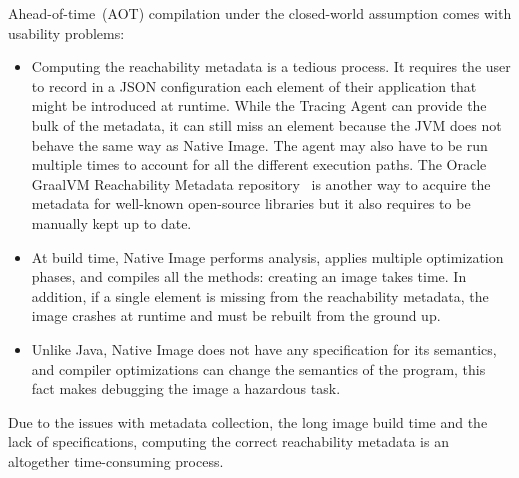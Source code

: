 Ahead-of-time~(AOT) compilation under the closed-world assumption comes with usability problems:
\begin{itemize}
    \item Computing the reachability metadata is a tedious process. It requires the user to record in a JSON configuration each element of their application that might be introduced at runtime. While the Tracing Agent can provide the bulk of the metadata, it can still miss an element because the JVM does not behave the same way as Native Image. The agent may also have to be run multiple times to account for all the different execution paths. The Oracle GraalVM Reachability Metadata repository~\cite{noauthor_oraclegraalvm-reachability-metadata_2024} is another way to acquire the metadata for well-known open-source libraries but it also requires to be manually kept up to date.
    \item At build time, Native Image performs analysis, applies multiple optimization phases, and compiles all the methods: creating an image takes time. In addition, if a single element is missing from the reachability metadata, the image crashes at runtime and must be rebuilt from the ground up. 
    \item Unlike Java, Native Image does not have any specification for its semantics, and compiler optimizations can change the semantics of the program, this fact makes debugging the image a hazardous task.
\end{itemize}
Due to the issues with metadata collection, the long image build time and the lack of specifications, computing the correct reachability metadata is an altogether time-consuming process. 

